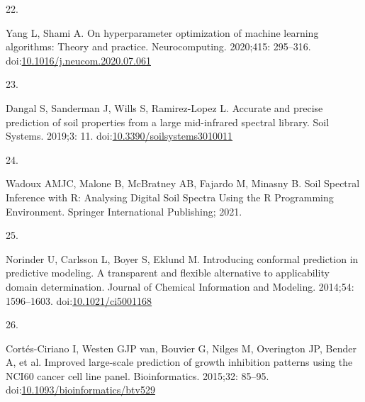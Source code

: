 \documentclass[
  letterpaper,
  DIV=11,
  numbers=noendperiod]{scrreprt}
\newlength{\cslhangindent}
\newlength{\csllabelwidth}
\newenvironment{CSLReferences}[2] %
 {\begin{list}{}{%
  \setlength{\itemindent}{0pt}
  \setlength{\leftmargin}{0pt}
  \setlength{\parsep}{0pt}
  \ifodd #1
   \setlength{\leftmargin}{\cslhangindent}
   \setlength{\itemindent}{-1\cslhangindent}
  \fi
  \setlength{\itemsep}{#2\baselineskip}}}
 {\end{list}}
\newcommand{\CSLLeftMargin}[1]{\parbox[t]{\csllabelwidth}{\strut#1\strut}}
\newcommand{\CSLRightInline}[1]{\parbox[t]{\linewidth - \csllabelwidth}{\strut#1\strut}}
\begin{document}
\begin{CSLReferences}{0}{1}
\CSLLeftMargin{22. }%
\CSLRightInline{Yang L, Shami A. On hyperparameter optimization of
machine learning algorithms: Theory and practice. Neurocomputing.
2020;415: 295--316.
doi:\href{https://doi.org/10.1016/j.neucom.2020.07.061}{10.1016/j.neucom.2020.07.061}}

\CSLLeftMargin{23. }%
\CSLRightInline{Dangal S, Sanderman J, Wills S, Ramirez-Lopez L.
Accurate and precise prediction of soil properties from a large
mid-infrared spectral library. Soil Systems. 2019;3: 11.
doi:\href{https://doi.org/10.3390/soilsystems3010011}{10.3390/soilsystems3010011}}

\CSLLeftMargin{24. }%
\CSLRightInline{Wadoux AMJC, Malone B, McBratney AB, Fajardo M, Minasny
B. {Soil Spectral Inference with R: Analysing Digital Soil Spectra Using
the R Programming Environment}. Springer International Publishing; 2021.
}

\CSLLeftMargin{25. }%
\CSLRightInline{Norinder U, Carlsson L, Boyer S, Eklund M. Introducing
conformal prediction in predictive modeling. A transparent and flexible
alternative to applicability domain determination. Journal of Chemical
Information and Modeling. 2014;54: 1596--1603.
doi:\href{https://doi.org/10.1021/ci5001168}{10.1021/ci5001168}}

\CSLLeftMargin{26. }%
\CSLRightInline{Cortés-Ciriano I, Westen GJP van, Bouvier G, Nilges M,
Overington JP, Bender A, et al. Improved large-scale prediction of
growth inhibition patterns using the {NCI}60 cancer cell line panel.
Bioinformatics. 2015;32: 85--95.
doi:\href{https://doi.org/10.1093/bioinformatics/btv529}{10.1093/bioinformatics/btv529}}

\end{CSLReferences}
\end{document}
